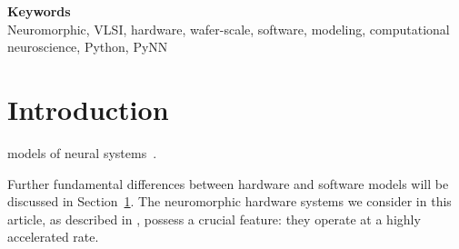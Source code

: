 \documentclass[10pt,a4paper]{scrartcl}
\begin{document}
{\bf \large \noindent Keywords}\\

\noindent Neuromorphic, VLSI, hardware, wafer-scale, software, modeling, computational neuroscience, Python, PyNN

\newpage
\section{\large Introduction}
\label{sec:introduction}

models of neural systems~\citep{vogelstein2007reconfigurable, merolla2006dynamic, hafliger2007adaptive, serrano_nips2005, renaud2007neuromimetic, schemmel_iscas07, schemmel_ijcnn2008, ehrlich_ssd07}.
 

Further fundamental differences between hardware and software models will be discussed in Section~\ref{sec:introduction}.
The neuromorphic hardware systems we consider in this article, as described in \cite{schemmel_iscas07, schemmel_ijcnn2008}, possess a crucial feature: they operate at a highly accelerated rate.

\end{document}
